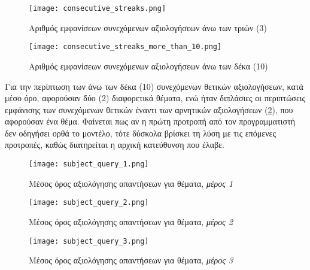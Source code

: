 \begin{figure}[H]
  \begin{center}
    \texttt{[image: consecutive\_streaks.png]}
    \caption{Αριθμός εμφανίσεων συνεχόμενων αξιολογήσεων άνω των τριών
      (3)}
  \end{center}
  \label{fig:ConsecutiveStreaks}
\end{figure}

\begin{figure}[H]
  \begin{center}
    \texttt{[image: consecutive\_streaks\_more\_than\_10.png]}
    \caption{Αριθμός εμφανίσεων συνεχόμενων αξιολογήσεων άνω των δέκα
      (10)}
  \end{center}
  \label{fig:ConsecutiveStreaks10}
\end{figure}

Για την περίπτωση των άνω των δέκα (10) συνεχόμενων θετικών
αξιολογήσεων, κατά μέσο όρο, αφορούσαν δύο (2) διαφορετικά θέματα, ενώ
ήταν διπλάσιες οι περιπτώσεις εμφάνισης των συνεχόμενων θετικών έναντι
των αρνητικών αξιολογήσεων (\ref{fig:ConsecutiveStreaks10}), που
αφορούσαν ένα θέμα. Φαίνεται πως αν η πρώτη προτροπή από τον
προγραμματιστή δεν οδηγήσει ορθά το μοντέλο, τότε δύσκολα βρίσκει τη
λύση με τις επόμενες προτροπές, καθώς διατηρείται η αρχική κατεύθυνση
που έλαβε.

\begin{figure}[H]
  \begin{center}
    \texttt{[image: subject\_query\_1.png]}
    \caption{Μέσος όρος αξιολόγησης απαντήσεων για θέματα, \textit{μέρος
        1}}
  \end{center}
  \label{fig:SubjectQuery1}
\end{figure}

\begin{figure}[H]
  \begin{center}
    \texttt{[image: subject\_query\_2.png]}
    \caption{Μέσος όρος αξιολόγησης απαντήσεων για θέματα, \textit{μέρος
        2}}
  \end{center}
  \label{fig:SubjectQuery2}
\end{figure}

\begin{figure}[H]
  \begin{center}
    \texttt{[image: subject\_query\_3.png]}
    \caption{Μέσος όρος αξιολόγησης απαντήσεων για θέματα, \textit{μέρος
        3}}
  \end{center}
  \label{fig:SubjectQuery3}
\end{figure}

